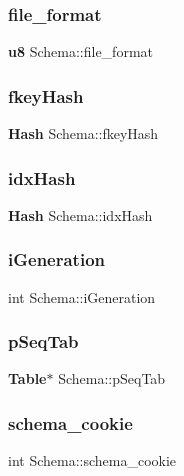 \subsubsection{file\_format}
{\footnotesize\ttfamily \textbf{ u8} Schema\+::file\+\_\+format}

\mbox{\label{struct_schema_ad51ed96351701cfe8d9e871722827c11}} 
\subsubsection{fkeyHash}
{\footnotesize\ttfamily \textbf{ Hash} Schema\+::fkey\+Hash}

\mbox{\label{struct_schema_ac0dd242f486d17ddadca1e47af76c6c5}} 
\subsubsection{idxHash}
{\footnotesize\ttfamily \textbf{ Hash} Schema\+::idx\+Hash}

\mbox{\label{struct_schema_a879b1597656c7cbcbb98cdb88e876874}} 
\subsubsection{iGeneration}
{\footnotesize\ttfamily int Schema\+::i\+Generation}

\mbox{\label{struct_schema_ad580e4e662724bee95571d297f94da37}} 
\subsubsection{pSeqTab}
{\footnotesize\ttfamily \textbf{ Table}$\ast$ Schema\+::p\+Seq\+Tab}

\mbox{\label{struct_schema_a3eef54a64f4f962d64577646bd34a47c}} 
\subsubsection{schema\_cookie}
{\footnotesize\ttfamily int Schema\+::schema\+\_\+cookie}

\mbox{\label{struct_schema_a19310cba7982138909683b1801258c18}} 
